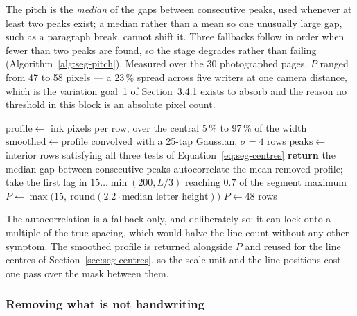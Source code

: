 The pitch is the \emph{median} of the gaps between consecutive peaks, used whenever at least two peaks exist; a median rather than a mean so one unusually large gap, such as a paragraph break, cannot shift it. Three fallbacks follow in order when fewer than two peaks are found, so the stage degrades rather than failing (Algorithm~\ref{alg:seg-pitch}). Measured over the 30 photographed pages, $P$ ranged from 47 to 58 pixels --- a 23\,\% spread across five writers at one camera distance, which is the variation goal~1 of Section~3.4.1 exists to absorb and the reason no threshold in this block is an absolute pixel count.

\begin{algorithm}[!htbp]
\caption{Measuring the line pitch, with three fallbacks}
\label{alg:seg-pitch}
\begin{algorithmic}[1]
\STATE $\mathrm{profile}\leftarrow$ ink pixels per row, over the central 5\,\% to 97\,\% of the width 
\STATE $\mathrm{smoothed}\leftarrow \mathrm{profile}$ convolved with a 25-tap Gaussian, $\sigma=4$ rows
\STATE $\mathrm{peaks}\leftarrow$ interior rows satisfying all three tests of Equation~\ref{eq:seg-centres}
    \STATE \textbf{return} the median gap between consecutive peaks 
\ELSE
    \STATE autocorrelate the mean-removed profile; take the first lag in $15\ldots\min(200,L/3)$ reaching $0.7$ of the segment maximum
\ENDIF
{}
    \STATE $P\leftarrow\max\bigl(15,\ \mathrm{round}(2.2\cdot\text{median letter height})\bigr)$
\ENDIF
{}
    \STATE $P\leftarrow48$ rows 
\ENDIF
\end{algorithmic}
\end{algorithm}

The autocorrelation is a fallback only, and deliberately so: it can lock onto a multiple of the true spacing, which would halve the line count without any other symptom. The smoothed profile is returned alongside $P$ and reused for the line centres of Section~\ref{sec:seg-centres}, so the scale unit and the line positions cost one pass over the mask between them.

\subsubsection{Removing what is not handwriting}
\label{sec:seg-cleanup}

